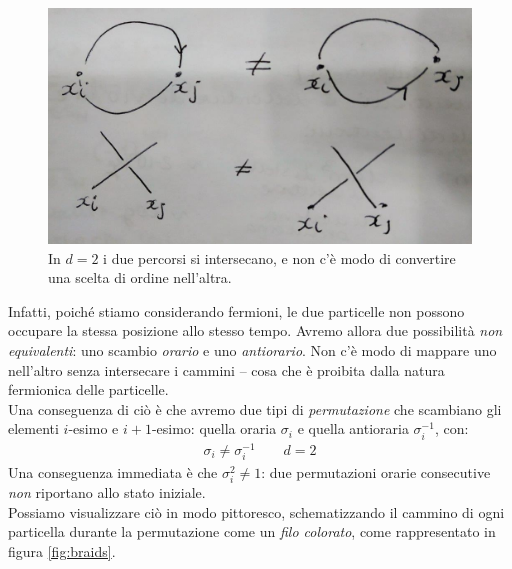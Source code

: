 \documentclass[../../FisicaTeorica.tex]{subfiles}
\begin{document}
\begin{figure}[H]
\centering
\includegraphics[scale=0.3]{Immagini/12_12/image006.jpg}
\caption{In $d=2$ i due percorsi si intersecano, e non c'è modo di convertire una scelta di ordine nell'altra.\label{fig:scambio2d}}
\end{figure}

Infatti, poiché stiamo considerando fermioni, le due particelle non possono occupare la stessa posizione allo stesso tempo. Avremo allora due possibilità \textit{non equivalenti}: uno scambio \textit{orario} e uno \textit{antiorario}. Non c'è modo di mappare uno nell'altro senza intersecare i cammini -- cosa che è proibita dalla natura fermionica delle particelle.\\
Una conseguenza di ciò è che avremo due tipi di \textit{permutazione} che scambiano gli elementi $i$-esimo e $i+1$-esimo: quella oraria $\sigma_i$ e quella antioraria $\sigma_{i}^{-1}$, con:
\begin{align*}
\sigma_i \neq \sigma_{i}^{-1} \qquad d=2
\end{align*}      
Una conseguenza immediata è che $\sigma_i^2\neq 1$: due permutazioni orarie consecutive \textit{non} riportano allo stato iniziale.\\
Possiamo visualizzare ciò in modo pittoresco, schematizzando il cammino di ogni particella durante la permutazione come un \textit{filo colorato}, come rappresentato in figura \ref{fig:braids}.
\end{document}
